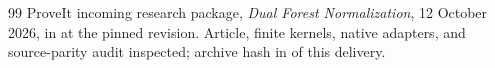 \begin{thebibliography}{99}
ProveIt incoming research package,
\emph{Dual Forest Normalization}, 12 October 2026,
 in
 at the pinned revision.
Article, finite kernels, native adapters, and source-parity audit inspected;
archive hash in  of this delivery.

\end{thebibliography}
